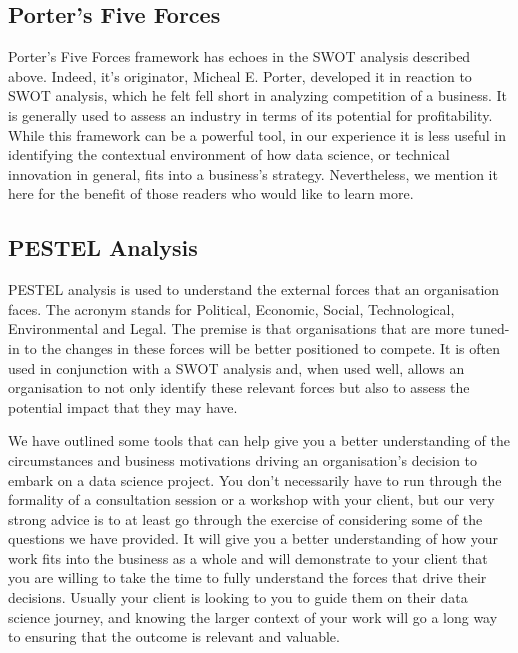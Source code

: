 \documentclass[
]{book}
\begin{document}
\hypertarget{porters-five-forces}{%
\subsection{Porter's Five Forces}\label{porters-five-forces}}

Porter's Five Forces framework has echoes in the SWOT analysis described above. Indeed, it's originator, Micheal E. Porter, developed it in reaction to SWOT analysis, which he felt fell short in analyzing competition of a business. It is generally used to assess an industry in terms of its potential for profitability. While this framework can be a powerful tool, in our experience it is less useful in identifying the contextual environment of how data science, or technical innovation in general, fits into a business's strategy. Nevertheless, we mention it here for the benefit of those readers who would like to learn more.

\hypertarget{pestel-analysis}{%
\subsection{PESTEL Analysis}\label{pestel-analysis}}

PESTEL analysis is used to understand the external forces that an organisation faces. The acronym stands for Political, Economic, Social, Technological, Environmental and Legal. The premise is that organisations that are more tuned-in to the changes in these forces will be better positioned to compete. It is often used in conjunction with a SWOT analysis and, when used well, allows an organisation to not only identify these relevant forces but also to assess the potential impact that they may have.

We have outlined some tools that can help give you a better understanding of the circumstances and business motivations driving an organisation's decision to embark on a data science project. You don't necessarily have to run through the formality of a consultation session or a workshop with your client, but our very strong advice is to at least go through the exercise of considering some of the questions we have provided. It will give you a better understanding of how your work fits into the business as a whole and will demonstrate to your client that you are willing to take the time to fully understand the forces that drive their decisions. Usually your client is looking to you to guide them on their data science journey, and knowing the larger context of your work will go a long way to ensuring that the outcome is relevant and valuable.
\end{document}

